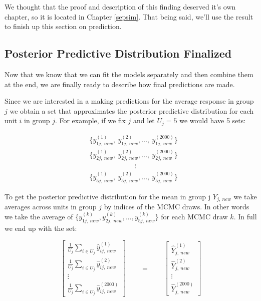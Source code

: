 \documentclass[12pt,twoside]{reedthesis}
\begin{document}
We thought that the proof and description of this finding deserved it's own chapter, so it is located in Chapter \ref{sepsim}. That being said, we'll use the result to finish up this section on prediction.

\hypertarget{wrapone}{%
\subsection{Posterior Predictive Distribution Finalized}\label{wrapone}}

Now that we know that we can fit the models separately and then combine them at the end, we are finally ready to describe how final predictions are made.

Since we are interested in a making predictions for the average response in group \(j\) we obtain a set that approximates the posterior predictive distribution for each unit \(i\) in group \(j\). For example, if we fix \(j\) and let \(U_j = 5\) we would have 5 sets:

\[
\begin{aligned}
&\Big\{y_{1j , \ new}^{(1)}, \ y_{1j, \ new}^{(2)}, ..., \ y_{1j, \ new}^{(2000)}\Big\} \\
&\Big\{y_{2j , \ new}^{(1)}, \ y_{2j, \ new}^{(2)}, ...,  \ y_{2j, \ new}^{(2000)}\Big\} \\
& \qquad \qquad \qquad \ \   \vdots \\
&\Big\{y_{5j , \ new}^{(1)}, \ y_{5j, \ new}^{(2)}, ..., \ y_{5j, \ new}^{(2000)}\Big\}
\end{aligned}
\]

To get the posterior predictive distribution for the mean in group j \(Y_{j, \ new}\) we take averages across units in group \(j\) by indices of the MCMC draws. In other words we take the average of \(\Big\{y_{1j, \ new}^{(k)}, y_{2j, \ new}^{(k)}, ... , y_{5j, \ new}^{(k)}\Big\}\) for each MCMC draw \(k\). In full we end up with the set:

\[
\begin{bmatrix}
\frac{1}{U_j} \sum_{i \in U_j}\hat{y}_{ij, \ new}^{(1)} \\
\frac{1}{U_j} \sum_{i \in U_j}\hat{y}_{ij, \ new}^{(2)} \\
\vdots \\
\frac{1}{U_j} \sum_{i \in U_j}\hat{y}_{ij, \ new}^{(2000)}
\end{bmatrix} \qquad = \qquad 
\begin{bmatrix}
\hat{Y}_{j, \ new}^{(1)} \\
\hat{Y}_{j, \ new}^{(2)} \\
\vdots \\
\hat{Y}_{j, \ new}^{(2000)}
\end{bmatrix}
\]
\end{document}
